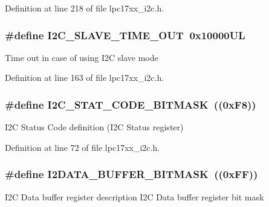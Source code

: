 \-Definition at line 218 of file lpc17xx\-\_\-i2c.\-h.

\hypertarget{group___i2_c___private___macros_ga33116b352c72ef28879812c66387f17a}{
\subsubsection[{\-I2\-C\-\_\-\-S\-L\-A\-V\-E\-\_\-\-T\-I\-M\-E\-\_\-\-O\-U\-T}]{\setlength{\rightskip}{0pt plus 5cm}\#define {\bf \-I2\-C\-\_\-\-S\-L\-A\-V\-E\-\_\-\-T\-I\-M\-E\-\_\-\-O\-U\-T}~0x10000\-U\-L}}\label{group___i2_c___private___macros_ga33116b352c72ef28879812c66387f17a}
\-Time out in case of using \-I2\-C slave mode 

\-Definition at line 163 of file lpc17xx\-\_\-i2c.\-h.

\hypertarget{group___i2_c___private___macros_gafeb8b5f682a81a2cc32f6c4b720a5e1f}{
\subsubsection[{\-I2\-C\-\_\-\-S\-T\-A\-T\-\_\-\-C\-O\-D\-E\-\_\-\-B\-I\-T\-M\-A\-S\-K}]{\setlength{\rightskip}{0pt plus 5cm}\#define {\bf \-I2\-C\-\_\-\-S\-T\-A\-T\-\_\-\-C\-O\-D\-E\-\_\-\-B\-I\-T\-M\-A\-S\-K}~((0x\-F8))}}\label{group___i2_c___private___macros_gafeb8b5f682a81a2cc32f6c4b720a5e1f}
\-I2\-C \-Status \-Code definition (\-I2\-C \-Status register) 

\-Definition at line 72 of file lpc17xx\-\_\-i2c.\-h.

\hypertarget{group___i2_c___private___macros_ga95d605cbb817fa36d9c83545dd23fb5f}{
\subsubsection[{\-I2\-D\-A\-T\-A\-\_\-\-B\-U\-F\-F\-E\-R\-\_\-\-B\-I\-T\-M\-A\-S\-K}]{\setlength{\rightskip}{0pt plus 5cm}\#define {\bf \-I2\-D\-A\-T\-A\-\_\-\-B\-U\-F\-F\-E\-R\-\_\-\-B\-I\-T\-M\-A\-S\-K}~((0x\-F\-F))}}\label{group___i2_c___private___macros_ga95d605cbb817fa36d9c83545dd23fb5f}
\-I2\-C \-Data buffer register description \-I2\-C \-Data buffer register bit mask 

